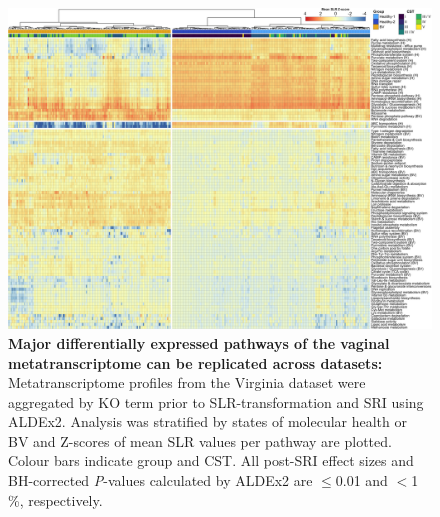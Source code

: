 \documentclass[sn-mathphys,Numbered]{sn-jnl}%
\begin{document}
\begin{figure}[H]
    \centering
    \includegraphics[scale = 0.78]{0_supplFig6.png}
    \caption{\textbf{Major differentially expressed pathways of the vaginal metatranscriptome can be replicated across datasets:} Metatranscriptome profiles from the Virginia dataset were aggregated by KO term prior to SLR-transformation and SRI using ALDEx2. Analysis was stratified by states of molecular health or BV and Z-scores of mean SLR values per pathway are plotted. Colour bars indicate group and CST. All post-SRI effect sizes and BH-corrected \textit{P}-values calculated by ALDEx2 are $\leq$0.01 and $<$1 \%, respectively.} \label{fig:sfigVirgHealthBV}
\end{figure}
\newpage
\end{document}
